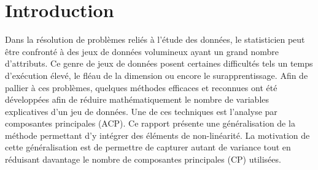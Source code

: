 \section{Introduction}

Dans la résolution de problèmes reliés à l’étude des données, le statisticien peut être confronté à des jeux de données volumineux ayant un grand nombre d’attributs. Ce genre de jeux de données posent certaines difficultés tels un temps d'exécution élevé, le fléau de la dimension ou encore le surapprentissage. Afin de pallier à ces problèmes, quelques méthodes efficaces et reconnues ont été développées afin de réduire mathématiquement le nombre de variables explicatives d’un jeu de données. Une de ces techniques est l’analyse par composantes principales (ACP). Ce rapport présente une généralisation de la méthode permettant d’y intégrer des éléments de non-linéarité. La motivation de cette généralisation est de permettre de capturer autant de variance tout en réduisant davantage le nombre de composantes principales (CP) utilisées.